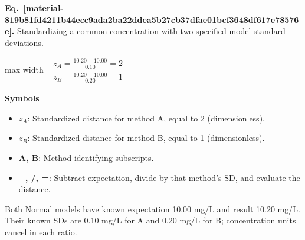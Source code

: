 \documentclass[11pt,a4paper]{article}
\begin{document}
\par\medskip
\noindent\begin{minipage}{\linewidth}
\label{material-819b81fd4211b44ecc9ada2ba22ddea5b27cb37dfae01bcf3648df617e78576e}
\noindent\textbf{Eq.~\ref*{material-819b81fd4211b44ecc9ada2ba22ddea5b27cb37dfae01bcf3648df617e78576e}.} Standardizing a common concentration with two specified model standard deviations.\par\nopagebreak
\begin{center}\begin{adjustbox}{max width=\linewidth}$\displaystyle \begin{gathered}z_A=\frac{10.20-10.00}{0.10}=2\\z_B=\frac{10.20-10.00}{0.20}=1\end{gathered}$\end{adjustbox}\end{center}

\par\noindent\textbf{Symbols}

\begin{itemize}\setlength{\itemsep}{1pt}\setlength{\parsep}{0pt}
\item \textbf{\(z_A\)}: Standardized distance for method A, equal to 2 (dimensionless).
\item \textbf{\(z_B\)}: Standardized distance for method B, equal to 1 (dimensionless).
\item \textbf{A, B}: Method-identifying subscripts.
\item \textbf{\ensuremath{-}, /, =}: Subtract expectation, divide by that method's SD, and evaluate the distance.
\end{itemize}

Both Normal models have known expectation 10.00 mg/L and result 10.20 mg/L. Their known SDs are 0.10 mg/L for A and 0.20 mg/L for B; concentration units cancel in each ratio.

\end{minipage}\par
\medskip
\end{document}
